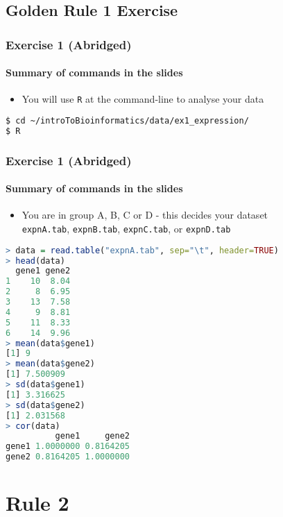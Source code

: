 \subsection{Golden Rule 1 Exercise}
\begin{frame}[fragile]
  \frametitle{Exercise 1 (Abridged)}
  \framesubtitle{Summary of commands in the slides}
  \begin{itemize}
    \item You will use \texttt{R} at the command-line to analyse your data
  \end{itemize}
\begin{lstlisting}[language=bash]
$ cd ~/introToBioinformatics/data/ex1_expression/
$ R
\end{lstlisting}

\end{frame}
\begin{frame}[fragile]
  \frametitle{Exercise 1 (Abridged)}
  \framesubtitle{Summary of commands in the slides}
  \begin{itemize}
    \item You are in group A, B, C or D - this decides your dataset\\
    \texttt{expnA.tab}, \texttt{expnB.tab}, \texttt{expnC.tab}, or \texttt{expnD.tab}
  \end{itemize}
\begin{lstlisting}[language=R]
> data = read.table("expnA.tab", sep="\t", header=TRUE)
> head(data)
  gene1 gene2
1    10  8.04
2     8  6.95
3    13  7.58
4     9  8.81
5    11  8.33
6    14  9.96
> mean(data$gene1)
[1] 9
> mean(data$gene2)
[1] 7.500909
> sd(data$gene1)
[1] 3.316625
> sd(data$gene2)
[1] 2.031568
> cor(data)
          gene1     gene2
gene1 1.0000000 0.8164205
gene2 0.8164205 1.0000000
\end{lstlisting}
\end{frame}

    

\section{Rule 2}
%
